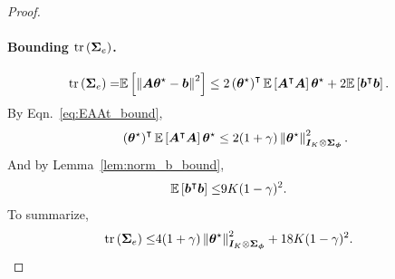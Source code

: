 \begin{proof}
\paragraph{Bounding $\operatorname{tr}\left({{\bm{\Sigma}}_{e}}\right)$.}
\begin{equation*}
    \begin{aligned}
        \operatorname{tr}\left({{\bm{\Sigma}}_{e}}\right)=&{\mathbb E}\left[{\left\|{{\bm{A}}{\bm{\theta}}^{\star}-{\bm{b}}}\right\|^2}\right]\leq2\left({{\bm{\theta}}^{\star}}\right)^{\intercal}{\mathbb E}\left[{{\bm{A}}^{\intercal}{\bm{A}}}\right]{\bm{\theta}}^{\star}+2{\mathbb E}\left[{{\bm{b}}^{\intercal}{\bm{b}}}\right].
    \end{aligned}
\end{equation*}
By Eqn.~\eqref{eq:EAAt_bound},
\begin{equation*}
    \begin{aligned}
\left({{\bm{\theta}}^{\star}}\right)^{\intercal}{\mathbb E}\left[{{\bm{A}}^{\intercal}{\bm{A}}}\right]{\bm{\theta}}^{\star}\leq 2(1+\gamma)\left\|{{\bm{\theta}}^{\star}}\right\|_{{\bm{I}}_K\otimes{\bm{\Sigma}}_{{\bm{\phi}}}}^2.
    \end{aligned}
\end{equation*}
And by Lemma~\ref{lem:norm_b_bound},
\begin{equation*}
    \begin{aligned}
        {\mathbb E}\left[{{\bm{b}}^{\intercal}{\bm{b}}}\right]
        \leq &9K(1-\gamma)^2.
    \end{aligned}
\end{equation*}
To summarize,
\begin{equation*}
    \begin{aligned}
        \operatorname{tr}\left({{\bm{\Sigma}}_{e}}\right)\leq& 4(1+\gamma)\left\|{{\bm{\theta}}^{\star}}\right\|_{{\bm{I}}_K\otimes{\bm{\Sigma}}_{{\bm{\phi}}}}^2+18K(1-\gamma)^2.
    \end{aligned}
\end{equation*}
\end{proof}

